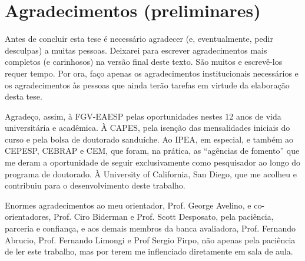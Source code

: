 
\chapter*{Agradecimentos (preliminares)}

Antes de concluir esta tese é necessário agradecer (e, eventualmente, pedir desculpas) a muitas pessoas. Deixarei para escrever agradecimentos mais completos (e carinhosos) na versão final deste texto. São muitos e escrevê-los requer tempo. Por ora, faço apenas os agradecimentos institucionais necessários e os agradecimentos às pessoas que ainda terão tarefas em virtude da elaboração desta tese.

Agradeço, assim, à FGV-EAESP pelas oportunidades nestes 12 anos de vida universitária e acadêmica. À CAPES, pela isenção das mensalidades iniciais do curso e pela bolsa de doutorado sanduíche. Ao IPEA, em especial, e também ao CEPESP, CEBRAP e CEM, que foram, na prática, as ``agências de fomento'' que me deram a oportunidade de seguir exclusivamente como pesquisador ao longo do programa de doutorado. À University of California, San Diego, que me acolheu e contribuiu para o desenvolvimento deste trabalho.

Enormes agradecimentos ao meu orientador, Prof. George Avelino, e co-orientadores, Prof. Ciro Biderman e Prof. Scott Desposato, pela paciência, parceria e confiança, e aos demais membros da banca avaliadora, Prof. Fernando Abrucio, Prof. Fernando Limongi e Prof Sergio Firpo, não apenas pela paciência de ler este trabalho, mas por terem me inflenciado diretamente em sala de aula.